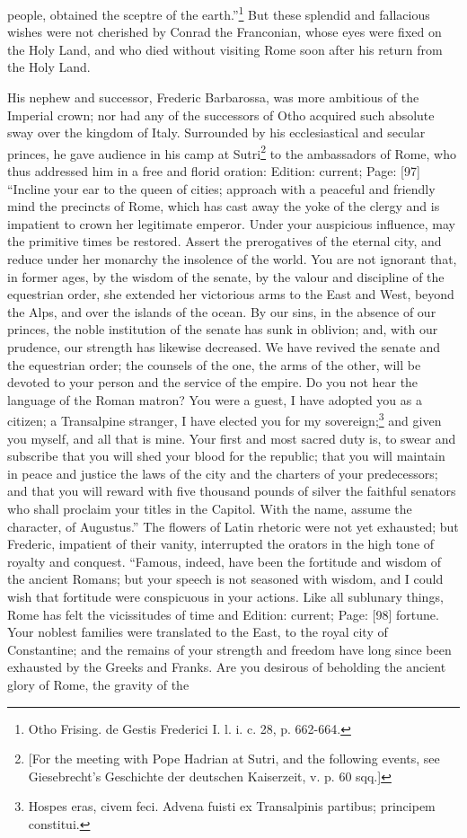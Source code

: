 people, obtained the sceptre of the earth.\texthebrew{}”\footnote{Otho Frising. de Gestis Frederici I. l. i. c. 28, p. 662-664.} But these splendid and fallacious wishes were not cherished by Conrad the Franconian, whose eyes were fixed on the Holy Land, and who died without visiting Rome soon after his return from the Holy Land.

His nephew and successor, Frederic Barbarossa, was more ambitious of the Imperial crown; nor had any of the successors of Otho acquired such absolute sway over the kingdom of Italy. Surrounded by his ecclesiastical and secular princes, he gave audience in his camp at Sutri\footnote{[For the meeting with Pope Hadrian at Sutri, and the following events, see Giesebrecht\texthebrew{}’s Geschichte der deutschen Kaiserzeit, v. p. 60 sqq.]} to the ambassadors of Rome, who thus addressed him in a free and florid oration: Edition: current; Page: [97] \texthebrew{“}Incline your ear to the queen of cities; approach with a peaceful and friendly mind the precincts of Rome, which has cast away the yoke of the clergy and is impatient to crown her legitimate emperor. Under your auspicious influence, may the primitive times be restored. Assert the prerogatives of the eternal city, and reduce under her monarchy the insolence of the world. You are not ignorant that, in former ages, by the wisdom of the senate, by the valour and discipline of the equestrian order, she extended her victorious arms to the East and West, beyond the Alps, and over the islands of the ocean. By our sins, in the absence of our princes, the noble institution of the senate has sunk in oblivion; and, with our prudence, our strength has likewise decreased. We have revived the senate and the equestrian order; the counsels of the one, the arms of the other, will be devoted to your person and the service of the empire. Do you not hear the language of the Roman matron? You were a guest, I have adopted you as a citizen; a Transalpine stranger, I have elected you for my sovereign;\footnote{Hospes eras, civem feci. Advena fuisti ex Transalpinis partibus; principem constitui.} and given you myself, and all that is mine. Your first and most sacred duty is, to swear and subscribe that you will shed your blood for the republic; that you will maintain in peace and justice the laws of the city and the charters of your predecessors; and that you will reward with five thousand pounds of silver the faithful senators who shall proclaim your titles in the Capitol. With the name, assume the character, of Augustus.\texthebrew{}” The flowers of Latin rhetoric were not yet exhausted; but Frederic, impatient of their vanity, interrupted the orators in the high tone of royalty and conquest. \texthebrew{“}Famous, indeed, have been the fortitude and wisdom of the ancient Romans; but your speech is not seasoned with wisdom, and I could wish that fortitude were conspicuous in your actions. Like all sublunary things, Rome has felt the vicissitudes of time and Edition: current; Page: [98] fortune. Your noblest families were translated to the East, to the royal city of Constantine; and the remains of your strength and freedom have long since been exhausted by the Greeks and Franks. Are you desirous of beholding the ancient glory of Rome, the gravity of the 
